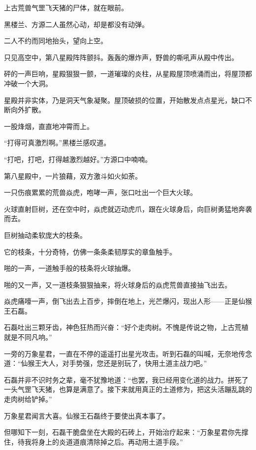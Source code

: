 
\begin{this_body}

上古荒兽气罡飞天猪的尸体，就在眼前。

黑楼兰、方源二人虽然心动，却是都没有动弹。

二人不约而同地抬头，望向上空。

只见高空中，第八星殿阵阵颤抖。轰轰的爆炸声，野兽的嘶吼声从殿中传出。

砰的一声巨响，星殿狠狠一颤，一道璀璨的炎柱，从星殿屋顶喷涌而出，将屋顶都冲破一个大洞。

星殿并非实体，乃是洞天气象凝聚。屋顶破损的位置，开始散发点点星光，缺口不断向外扩散。

一股烽烟，直直地冲霄而上。

“打得可真激烈啊。”黑楼兰感叹道。

“打吧，打吧，打得越激烈越好。”方源口中喃喃。

第八星殿中，一片狼藉，双方激斗如火如荼。

一只伤痕累累的荒兽焱虎，咆哮一声，张口吐出一个巨大火球。

火球直射巨树，还在空中时，焱虎就迈动虎爪，跟在火球身后，向巨树勇猛地奔袭而去。

巨树抽动柔软庞大的枝条。

它的枝条，十分奇特，仿佛一条条柔韧厚实的章鱼触手。

啪的一声，一道触手般的枝条将火球抽爆。

啪的又一声，又一道枝条狠狠抽来，将火球身后的焱虎荒兽直接抽飞出去。

焱虎痛嚎一声，倒飞出去上百步，摔倒在地上，光芒爆闪，现出人形——正是仙猴王石磊。

石磊吐出三颗牙齿，神色狂热而兴奋：“好个走肉树。不愧是传说之物，上古荒植就是不同凡响。”

一旁的万象星君，一直在不停的遥遥打出星光攻击。听到石磊的叫喊，无奈地传念道：“仙猴王大人，对手势强，您还是别玩了，快用土道主战力吧。”

石磊并非不识时务之辈，毫不犹豫地道：“也罢，我已经用变化道的战力。拼死了一头气罡飞天猪，也算是满意了。接下来就用真正的土道修为，把这头活蹦乱跳的走肉树给铲掉。”

万象星君闻言大喜。仙猴王石磊终于要使出真本事了。

但哪知下一刻，石磊干脆盘坐在大殿的石砖上，开始治疗起来：“万象星君你先撑住，待我将身上的炎道道痕清除掉之后。再动用土道手段。”


\end{this_body}
